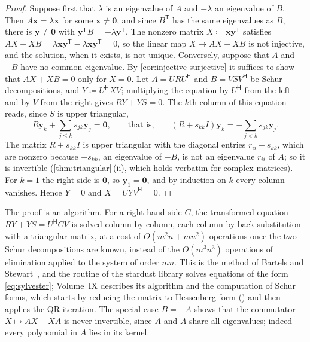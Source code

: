 \begin{proof}
Suppose first that $\lambda$ is an eigenvalue of $A$ and $-\lambda$ an eigenvalue of $B$. Then $A\mathbf x=\lambda\mathbf x$ for some $\mathbf x\ne\mathbf 0$, and since $B^{\mathsf T}$ has the same eigenvalues as $B$, there is $\mathbf y\ne\mathbf 0$ with $\mathbf y^{\mathsf T}B=-\lambda\mathbf y^{\mathsf T}$. The nonzero matrix $X\coloneqq\mathbf x\mathbf y^{\mathsf T}$ satisfies $AX+XB=\lambda\mathbf x\mathbf y^{\mathsf T}-\lambda\mathbf x\mathbf y^{\mathsf T}=0$, so the linear map $X\mapsto AX+XB$ is not injective, and the solution, when it exists, is not unique. Conversely, suppose that $A$ and $-B$ have no common eigenvalue. By \cref{cor:injective-surjective} it suffices to show that $AX+XB=0$ only for $X=0$. Let $A=URU^{\mathsf H}$ and $B=VSV^{\mathsf H}$ be Schur decompositions, and $Y\coloneqq U^{\mathsf H}XV$; multiplying the equation by $U^{\mathsf H}$ from the left and by $V$ from the right gives $RY+YS=0$. The $k$th column of this equation reads, since $S$ is upper triangular,
\[
R\mathbf y_k+\sum_{j\le k}s_{jk}\mathbf y_j=\mathbf 0,\qquad\text{that is,}\qquad(R+s_{kk}I)\mathbf y_k=-\sum_{j<k}s_{jk}\mathbf y_j .
\]
The matrix $R+s_{kk}I$ is upper triangular with the diagonal entries $r_{ii}+s_{kk}$, which are nonzero because $-s_{kk}$, an eigenvalue of $-B$, is not an eigenvalue $r_{ii}$ of $A$; so it is invertible (\cref{thm:triangular}\,(ii), which holds verbatim for complex matrices). For $k=1$ the right side is $\mathbf 0$, so $\mathbf y_1=\mathbf 0$, and by induction on $k$ every column vanishes. Hence $Y=0$ and $X=UYV^{\mathsf H}=0$.
\end{proof}

The proof is an algorithm. For a right-hand side $C$, the transformed equation $RY+YS=U^{\mathsf H}CV$ is solved column by column, each column by back substitution with a triangular matrix, at a cost of $O(m^2n+mn^2)$ operations once the two Schur decompositions are known, instead of the $O(m^3n^3)$ operations of elimination applied to the system of order $mn$. This is the method of Bartels and Stewart~\cite{bartels1972}, and the routine  of the stardust library solves equations of the form \eqref{eq:sylvester}; Volume~IX describes its algorithm and the computation of Schur forms, which starts by reducing the matrix to Hessenberg form () and then applies the QR iteration. The special case $B=-A$ shows that the commutator $X\mapsto AX-XA$ is never invertible, since $A$ and $A$ share all eigenvalues; indeed every polynomial in $A$ lies in its kernel.

